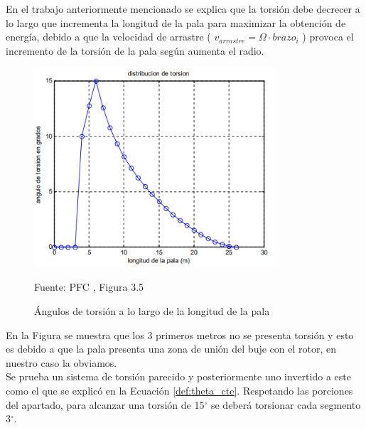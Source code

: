 En el trabajo anteriormente mencionado se explica que la torsión debe decrecer a lo largo que incrementa la longitud de la pala para maximizar la obtención de energía, debido a que la velocidad de arrastre ( $v_{arrastre} = \Omega \cdot brazo_i$ ) provoca el incremento de la torsión de la pala según aumenta el radio.


\begin{figure}[H]
    \centering
    \includegraphics[width=0.8\textwidth]{images/distribución torsión.PNG}
    \caption{ Ángulos de torsión a lo largo de la longitud de la pala }
    Fuente: PFC \cite{funes2009analisis}, Figura 3.5
     \label{fig:torsion_decrece_radio}
\end{figure}

En la Figura se muestra que los 3 primeros metros no se presenta torsión y esto es debido a que la pala presenta una zona de unión del buje con el rotor, en nuestro caso la obviamos.\\

Se prueba un sistema de torsión parecido y posteriormente uno invertido a este como el que se explicó en la Ecuación \ref{def:theta_cte}. Respetando las porciones del apartado, para alcanzar una torsión de 15$^{\circ}$ se deberá torsionar cada segmento 3$^{\circ}$.


